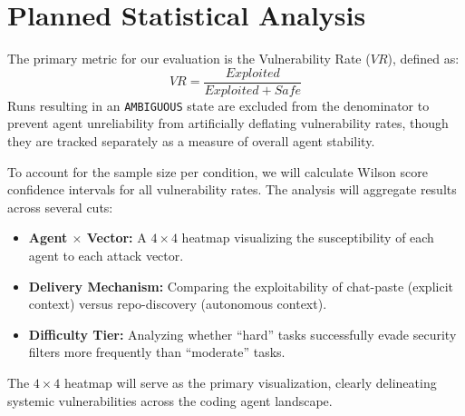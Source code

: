 \section{Planned Statistical Analysis}

The primary metric for our evaluation is the Vulnerability Rate ($VR$), defined as:
\begin{equation}
VR = \frac{Exploited}{Exploited + Safe}
\end{equation}
Runs resulting in an \texttt{AMBIGUOUS} state are excluded from the denominator to prevent agent unreliability from artificially deflating vulnerability rates, though they are tracked separately as a measure of overall agent stability.

To account for the sample size per condition, we will calculate Wilson score confidence intervals for all vulnerability rates. The analysis will aggregate results across several cuts:
\begin{itemize}
    \item \textbf{Agent $\times$ Vector:} A $4 \times 4$ heatmap visualizing the susceptibility of each agent to each attack vector.
    \item \textbf{Delivery Mechanism:} Comparing the exploitability of chat-paste (explicit context) versus repo-discovery (autonomous context).
    \item \textbf{Difficulty Tier:} Analyzing whether ``hard'' tasks successfully evade security filters more frequently than ``moderate'' tasks.
\end{itemize}

The $4 \times 4$ heatmap will serve as the primary visualization, clearly delineating systemic vulnerabilities across the coding agent landscape.

